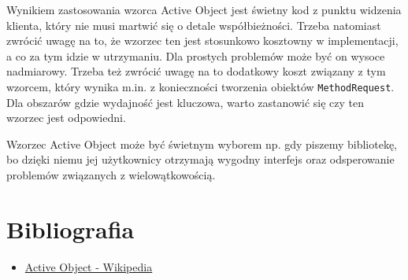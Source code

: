 \documentclass[11pt]{article}
\begin{document}
Wynikiem zastosowania wzorca Active Object jest świetny kod z punktu widzenia
klienta, który nie musi martwić się o detale współbieżności.
Trzeba natomiast zwrócić uwagę na to, że wzorzec ten jest stosunkowo kosztowny
w implementacji, a co za tym idzie w utrzymaniu. Dla prostych problemów
może być on wysoce nadmiarowy. Trzeba też zwrócić uwagę na to dodatkowy
koszt związany z tym wzorcem, który wynika m.in. z konieczności tworzenia obiektów
\texttt{MethodRequest}. Dla obszarów gdzie wydajność jest kluczowa, warto zastanowić się
czy ten wzorzec jest odpowiedni.


Wzorzec Active Object może być świetnym wyborem np. gdy piszemy bibliotekę,
bo dzięki niemu jej użytkownicy otrzymają wygodny interfejs oraz odsperowanie
problemów związanych z wielowątkowością.
\section*{Bibliografia}
\label{sec:orgd55fe5a}
\begin{itemize}
\item \href{https://pl.wikipedia.org/wiki/Active\_object}{Active Object - Wikipedia}
\end{itemize}
\end{document}
